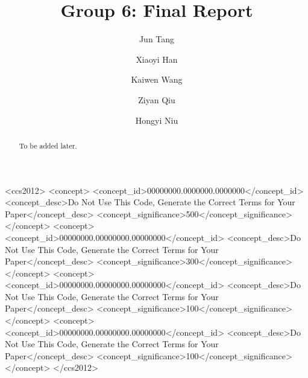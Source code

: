 \documentclass[sigconf]{acmart}
\begin{document}
\title{Group 6: Final Report}

\author{Jun Tang}

\author{Xiaoyi Han}

\author{Kaiwen Wang}

\author{Ziyan Qiu}

\author{Hongyi Niu}


\renewcommand{\shortauthors}{}   %
\fancyhead{}                     %

\newif\ifprintabstract
\printabstractfalse   %

\ifprintabstract
\begin{abstract}
To be added later.
\end{abstract}


\begin{CCSXML}
<ccs2012>
 <concept>
  <concept_id>00000000.0000000.0000000</concept_id>
  <concept_desc>Do Not Use This Code, Generate the Correct Terms for Your Paper</concept_desc>
  <concept_significance>500</concept_significance>
 </concept>
 <concept>
  <concept_id>00000000.00000000.00000000</concept_id>
  <concept_desc>Do Not Use This Code, Generate the Correct Terms for Your Paper</concept_desc>
  <concept_significance>300</concept_significance>
 </concept>
 <concept>
  <concept_id>00000000.00000000.00000000</concept_id>
  <concept_desc>Do Not Use This Code, Generate the Correct Terms for Your Paper</concept_desc>
  <concept_significance>100</concept_significance>
 </concept>
 <concept>
  <concept_id>00000000.00000000.00000000</concept_id>
  <concept_desc>Do Not Use This Code, Generate the Correct Terms for Your Paper</concept_desc>
  <concept_significance>100</concept_significance>
 </concept>
</ccs2012>
\end{CCSXML}
\end{document}
